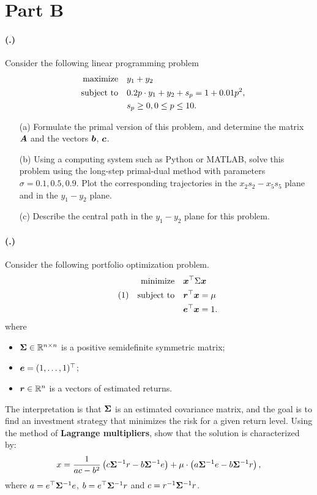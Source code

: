 \documentclass{article}
\newcounter{problemSheetNumber}
\newcounter{problems}
\renewcommand{\problem}{\paragraph{(\theproblemSheetNumber.\theproblems)}\addtocounter{problems}{1}}
\begin{document}
\section*{Part B}

\problem Consider the following linear programming problem
\begin{align*}
 \text{maximize}\quad & y_1+y_2\\
 \quad\text{subject to}\quad & 0.2p\cdot y_1+y_2+s_p=1+0.01p^2,\\
 & s_p\geq 0, 0\leq p\leq 10.
\end{align*}
\begin{itemize}
 \item[(a)] Formulate the primal version of this problem, and determine the matrix $\bm{A}$ and the vectors $\bm{b}$, $\bm{c}$.
 \item[(b)] Using a computing system such as Python or MATLAB, solve this problem using the long-step primal-dual method with parameters $\sigma=0.1, 0.5, 0.9$. Plot the corresponding trajectories in the $x_2s_2-x_5s_5$ plane and in the $y_1-y_2$ plane. 
 \item[(c)] Describe the central path in the $y_1-y_2$ plane for this problem.
\end{itemize}

\problem Consider the following portfolio optimization problem.
\begin{align}\label{eq:opt1}\tag{1}
\begin{split}
 \text{minimize}\quad & \bm{x}^{\top}\Sigma\bm{x}\\
 \quad\text{subject to}\quad & \bm{r}^{\top}\bm{x}=\mu\\
 & \bm{e}^{\top}\bm{x}=1.
 \end{split}
\end{align}
where
\begin{itemize}
 \item $\bm{\Sigma}\in \mathbb{R}^{n\times n}$ is a positive semidefinite symmetric matrix;
 \item $\bm{e} = (1,\dots,1)^{\top}$;
 \item $\bm{r}\in \mathbb{R}^n$ is a vectors of estimated returns.
\end{itemize}

The interpretation is that $\bm{\Sigma}$ is an estimated covariance matrix, and the goal is to find an investment strategy that minimizes the risk for a given return level.
Using the method of \textbf{Lagrange multipliers}, show that the solution is characterized by:
\begin{equation*}
 x = \frac{1}{ac-b^2} \left(c\bm{\Sigma}^{-1}r-b\bm{\Sigma}^{-1}e\right)+\mu\cdot \left(a\bm{\Sigma}^{-1}e-b\bm{\Sigma}^{-1}r\right),
\end{equation*}
where $a=e^{\top}\bm{\Sigma}^{-1}e$, $b=e^{\top}\bm{\Sigma}^{-1}r$ and $c=r^{-1}\bm{\Sigma}^{-1}r$.
\end{document}

